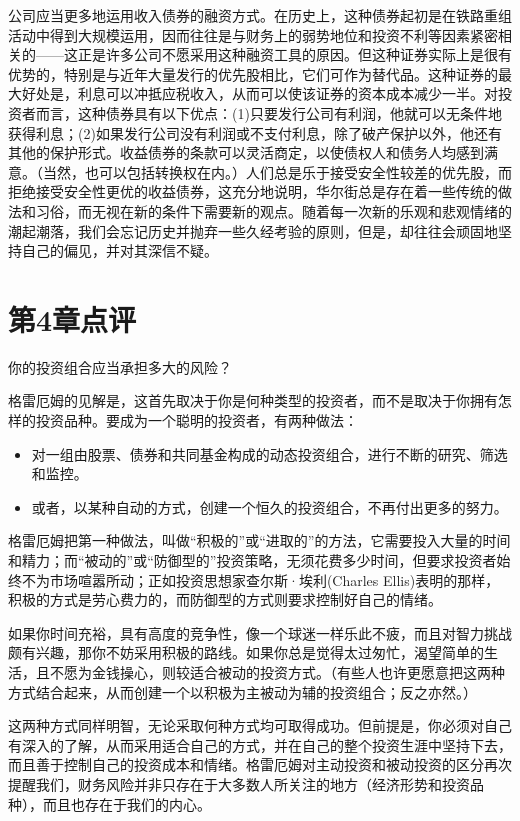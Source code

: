 \documentclass[12pt,oneside]{book}
\begin{document}
公司应当更多地运用收入债券的融资方式。在历史上，这种债券起初是在铁路重组活动中得到大规模运用，因而往往是与财务上的弱势地位和投资不利等因素紧密相关的——这正是许多公司不愿采用这种融资工具的原因。但这种证券实际上是很有优势的，特别是与近年大量发行的优先股相比，它们可作为替代品。这种证券的最大好处是，利息可以冲抵应税收入，从而可以使该证券的资本成本减少一半。对投资者而言，这种债券具有以下优点：(1)只要发行公司有利润，他就可以无条件地获得利息；(2)如果发行公司没有利润或不支付利息，除了破产保护以外，他还有其他的保护形式。收益债券的条款可以灵活商定，以使债权人和债务人均感到满意。（当然，也可以包括转换权在内。）人们总是乐于接受安全性较差的优先股，而拒绝接受安全性更优的收益债券，这充分地说明，华尔街总是存在着一些传统的做法和习俗，而无视在新的条件下需要新的观点。随着每一次新的乐观和悲观情绪的潮起潮落，我们会忘记历史并抛弃一些久经考验的原则，但是，却往往会顽固地坚持自己的偏见，并对其深信不疑。


\section{第4章点评}
你的投资组合应当承担多大的风险？

格雷厄姆的见解是，这首先取决于你是何种类型的投资者，而不是取决于你拥有怎样的投资品种。要成为一个聪明的投资者，有两种做法：

\begin{itemize}
\item 对一组由股票、债券和共同基金构成的动态投资组合，进行不断的研究、筛选和监控。
\item 或者，以某种自动的方式，创建一个恒久的投资组合，不再付出更多的努力。
\end{itemize}

格雷厄姆把第一种做法，叫做“积极的”或“进取的”的方法，它需要投入大量的时间和精力；而“被动的”或“防御型的”投资策略，无须花费多少时间，但要求投资者始终不为市场喧嚣所动；正如投资思想家查尔斯·埃利(Charles Ellis)表明的那样，积极的方式是劳心费力的，而防御型的方式则要求控制好自己的情绪。

如果你时间充裕，具有高度的竞争性，像一个球迷一样乐此不疲，而且对智力挑战颇有兴趣，那你不妨采用积极的路线。如果你总是觉得太过匆忙，渴望简单的生活，且不愿为金钱操心，则较适合被动的投资方式。（有些人也许更愿意把这两种方式结合起来，从而创建一个以积极为主被动为辅的投资组合；反之亦然。）

这两种方式同样明智，无论采取何种方式均可取得成功。但前提是，你必须对自己有深入的了解，从而采用适合自己的方式，并在自己的整个投资生涯中坚持下去，而且善于控制自己的投资成本和情绪。格雷厄姆对主动投资和被动投资的区分再次提醒我们，财务风险并非只存在于大多数人所关注的地方（经济形势和投资品种），而且也存在于我们的内心。
\end{document}
